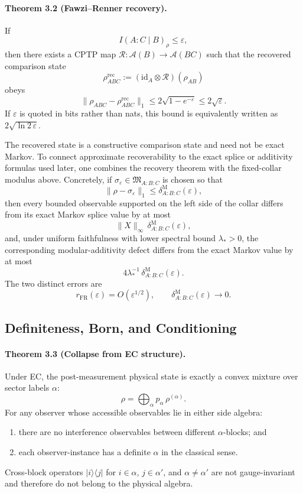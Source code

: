 \paragraph{\textbf{Theorem 3.2 (Fawzi--Renner recovery).}}
If
\[
I(A:C\mid B)_\rho\le\varepsilon,
\]
then there exists a CPTP map \(\mathcal R:\mathcal A(B)\to\mathcal A(BC)\) such that the
recovered comparison state
\[
\rho^{\mathrm{rec}}_{ABC}
:=
(\mathrm{id}_A\otimes\mathcal R)(\rho_{AB})
\]
obeys
\[
\|\rho_{ABC}-\rho^{\mathrm{rec}}_{ABC}\|_1
\le
2\sqrt{1-e^{-\varepsilon}}
\le
2\sqrt{\varepsilon}.
\]
If \(\varepsilon\) is quoted in bits rather than nats, this bound is equivalently written as
\(2\sqrt{\ln 2\,\varepsilon}\).

The recovered state is a constructive comparison state and need not be exact Markov. To connect
approximate recoverability to the exact splice or additivity formulas used later, one combines the
recovery theorem with the fixed-collar modulus above. Concretely, if
\(\sigma_\varepsilon\in\mathfrak M_{A:B:C}\) is chosen so that
\[
\|\rho-\sigma_\varepsilon\|_1
\le
\delta^{\mathrm M}_{A:B:C}(\varepsilon),
\]
then every bounded observable supported on the left side of the collar differs from its exact
Markov splice value by at most
\[
\|X\|_\infty\,\delta^{\mathrm M}_{A:B:C}(\varepsilon),
\]
and, under uniform faithfulness with lower spectral bound \(\lambda_\ast>0\), the corresponding
modular-additivity defect differs from the exact Markov value by at most
\[
4\lambda_\ast^{-1}\,\delta^{\mathrm M}_{A:B:C}(\varepsilon).
\]
The two distinct errors are
\[
r_{\mathrm{FR}}(\varepsilon)=O(\varepsilon^{1/2}),
\qquad
\delta^{\mathrm M}_{A:B:C}(\varepsilon)\to0.
\]

\subsection{Definiteness, Born, and Conditioning}

\paragraph{\textbf{Theorem 3.3 (Collapse from EC structure).}}
Under EC, the post-measurement physical state is exactly a convex mixture over sector labels
\(\alpha\):
\[
\rho=\bigoplus_\alpha p_\alpha\,\rho^{(\alpha)}.
\]
For any observer whose accessible observables lie in either side algebra:
\begin{enumerate}[leftmargin=2em]
\item there are no interference observables between different \(\alpha\)-blocks; and
\item each observer-instance has a definite \(\alpha\) in the classical sense.
\end{enumerate}
Cross-block operators \(|i\rangle\langle j|\) for \(i\in\alpha\), \(j\in\alpha'\), and
\(\alpha\neq\alpha'\) are not gauge-invariant and therefore do not belong to the physical algebra.

